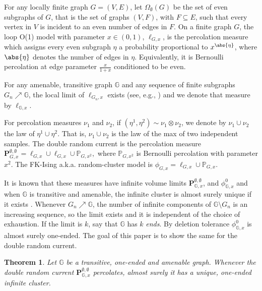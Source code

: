 \documentclass[article,11pt,reqno]{amsart}
\newcommand{\Prbcur}{\mathbf{P}}
\newtheorem{theorem}{Theorem}[section]
\begin{document}
For any locally finite graph $G=(V,E)$, let $\Omega_\emptyset(G)$ be the set of even subgraphs of $G$, that is the set of graphs $(V,F)$, with $F \subseteq E$, such that every vertex in $V$ is incident to an even number of edges in $F$.
On a finite graph $G$, the loop O(1) model with parameter $x \in (0,1)$,  $\ell_{G,x}$, is the percolation measure which assigns every even subgraph $\eta$ a probability proportional to $x^{\abs{\eta}}$, where $\abs{\eta}$ denotes the number of edges in $\eta$. Equivalently, it is Bernoulli percolation at edge parameter $\frac{x}{1+x}$ conditioned to be even.




For any amenable, transitive graph $\mathbb{G}$ and any sequence of finite subgraphs $G_n \nearrow \mathbb{G}$, the local limit of $\ell_{G_n,x}$ exists (see, e.g., \cite[Appendix A]{hansen2026supercriticalloopo1random}) and we denote that  measure by $\ell_{\mathbb{G},x}$.


For percolation measures $\nu_1$ and $\nu_2$, if   $(\eta^1, \eta^2) \sim \nu_1 \otimes \nu_2$, we denote by $\nu_1 \cup \nu_2$ the law of $\eta^1 \cup \eta^2$. That is, $\nu_1\cup \nu_2$ is the law of the max of two independent samples. The double random current is the percolation measure $\Prbcur_{G,x}^{\emptyset,\emptyset} = \ell_{G,x} \cup \ell_{G,x} \cup \mathbb{P}_{G,x^2},$ where  $\mathbb{P}_{G,x^2}$ is Bernoulli percolation with parameter $x^2$. The FK-Ising a.k.a. random-cluster model is
$\phi_{G,x} = \ell_{G,x} \cup \mathbb{P}_{G,x}$.


It is known that these measures have infinite volume limits $\Prbcur_{\mathbb{G},x}^{\emptyset,\emptyset}$, and $\phi_{\mathbb{G},x}^0$ and when $\mathbb{G}$ is transitive and amenable, the infinite cluster is almost surely unique if it exists \cite{aizenman2015random, burton1991topological}.
Whenever $G_n \nearrow \mathbb{G}$, the number of infinite components of $\mathbb{G} \setminus G_n$ is an increasing sequence, so the limit exists and it is independent of the choice of exhaustion. If the limit is $k$, say that $\mathbb{G}$ has $k$ \emph{ends}. By deletion tolerance  $\phi_{\mathbb{G},x}^0$ is almost surely one-ended. The goal of this paper is to show the same for the double random current. %
\begin{theorem}\label{thm:double_current_has_one_end}
Let $\mathbb{G}$ be a transitive, one-ended and amenable graph. Whenever the double random current $\Prbcur^{\emptyset,\emptyset}_{\mathbb{G},x}$  percolates, almost surely it has a unique, one-ended infinite cluster.
\end{theorem}
\end{document}
